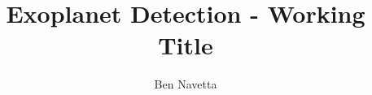 \usepackage[backend=biber, style=phys]{biblatex}


\author{Ben Navetta}
\title{Exoplanet Detection - Working Title}
